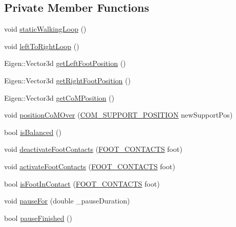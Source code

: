 \subsection*{Private Member Functions}
\begin{DoxyCompactItemize}
\item 
void \hyperlink{classSteppingDemoClient_a0f6b689c5f032351484b03e71a3530e1}{static\+Walking\+Loop} ()
\item 
void \hyperlink{classSteppingDemoClient_a94b990ae53b1b40ef8f9469b427d171c}{left\+To\+Right\+Loop} ()
\item 
Eigen\+::\+Vector3d \hyperlink{classSteppingDemoClient_af6a814243828f5136476aa5e99ea0079}{get\+Left\+Foot\+Position} ()
\item 
Eigen\+::\+Vector3d \hyperlink{classSteppingDemoClient_ae9c0d72756c109f49c269a7e1b06454a}{get\+Right\+Foot\+Position} ()
\item 
Eigen\+::\+Vector3d \hyperlink{classSteppingDemoClient_a857aa530a4ab94443d0b0869121baf76}{get\+Co\+M\+Position} ()
\item 
void \hyperlink{classSteppingDemoClient_a18609e5634a283423c228106bb0e3a45}{position\+Co\+M\+Over} (\hyperlink{SteppingDemoClient_8h_ac0c3848a609566394821d9826e0fdd5b}{C\+O\+M\+\_\+\+S\+U\+P\+P\+O\+R\+T\+\_\+\+P\+O\+S\+I\+T\+I\+ON} new\+Support\+Pos)
\item 
bool \hyperlink{classSteppingDemoClient_ad8fbc186267a47a73bb77e78199f2b8c}{is\+Balanced} ()
\item 
void \hyperlink{classSteppingDemoClient_a62b5028bdc99de117cfffc576478a0f1}{deactivate\+Foot\+Contacts} (\hyperlink{SteppingDemoClient_8h_ab0673d7f17cdd57b8fa124abb330287f}{F\+O\+O\+T\+\_\+\+C\+O\+N\+T\+A\+C\+TS} foot)
\item 
void \hyperlink{classSteppingDemoClient_abf583698c8c03620516acf3ec6eb9e41}{activate\+Foot\+Contacts} (\hyperlink{SteppingDemoClient_8h_ab0673d7f17cdd57b8fa124abb330287f}{F\+O\+O\+T\+\_\+\+C\+O\+N\+T\+A\+C\+TS} foot)
\item 
bool \hyperlink{classSteppingDemoClient_aeeaa9fac47e3e5a141647b07fa2feaa3}{is\+Foot\+In\+Contact} (\hyperlink{SteppingDemoClient_8h_ab0673d7f17cdd57b8fa124abb330287f}{F\+O\+O\+T\+\_\+\+C\+O\+N\+T\+A\+C\+TS} foot)
\item 
void \hyperlink{classSteppingDemoClient_a6b5d8bf0ce08c8b9f66ac2c1bbd5bcd7}{pause\+For} (double \+\_\+pause\+Duration)
\item 
bool \hyperlink{classSteppingDemoClient_afe78b799d8b8c63cff7d1e8765b7e1fa}{pause\+Finished} ()
\item 

\end{DoxyCompactItemize}
